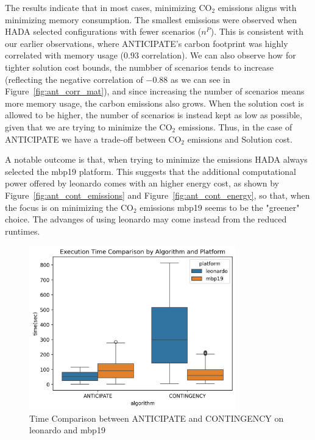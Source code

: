 \documentclass[a4paper,singleside,12pt]{report} %
\begin{document}
The results indicate that in most cases, minimizing CO$_2$ emissions aligns with minimizing memory consumption. The smallest emissions were observed when HADA selected configurations with fewer
scenarios ($n^P$). This is consistent with our earlier observations, where ANTICIPATE's carbon footprint was highly correlated with memory usage ($0.93$ correlation). We can also observe how
for tighter solution cost bounds, the numbber of scenarios tends to increase (reflecting the negative correlation of $-0.88$ as we can see in Figure~\ref{fig:ant_corr_mat}), and since increasing the 
number of scenarios means more memory usage, the carbon emissions also grows. When the solution cost is allowed to be higher, the number of scenarios is instead kept as low as possible, given
that we are trying to minimize the CO$_2$ emissions. Thus, in the case of ANTICIPATE we have a trade-off between CO$_2$ emissions and Solution cost.

A notable outcome is that, when trying to minimize the emissions HADA always selected the mbp19 platform. This suggests that the additional computational power offered by leonardo comes with an
higher energy cost, as shown by Figure~\ref{fig:ant_cont_emissions} and Figure~\ref{fig:ant_cont_energy}, so that, when the focus is on minimizing the CO$_2$ emissions mbp19 seems to be the "greener" choice.
The advanges of using leonardo may come instead from the reduced runtimes.

\begin{figure}[h!]
    \centering
    \includegraphics[width=0.8\textwidth]{imgs/time_comparison.png}
    \caption{Time Comparison between ANTICIPATE and CONTINGENCY on leonardo and mbp19}
    \label{fig:time_comparison}
\end{figure}
\end{document}
